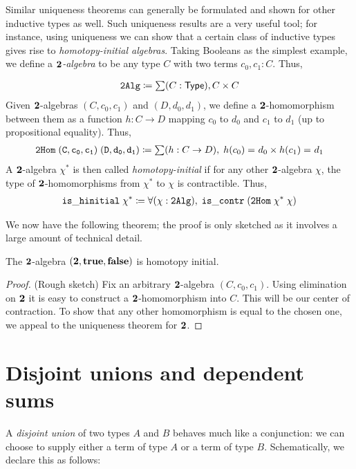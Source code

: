Similar uniqueness theorems can generally be formulated and shown for other inductive types as well. Such uniqueness results are a very useful tool; for instance, using uniqueness we can show that a certain class of inductive types gives rise to \emph{homotopy-initial algebras}. Taking Booleans as the simplest example, we define a \emph{$\mathbf{2}$-algebra} to be any type $C$ with two terms $c_0, c_1 : C$. Thus,

\begin{align*}
\mathtt{2Alg} \defeq \sm {C : \type} C \times C
\end{align*}
Given $\mathbf{2}$-algebras $(C,c_0,c_1)$ and $(D,d_0,d_1)$, we define a $\mathbf{2}$-homomorphism between them as a function $h : C \to D$ mapping $c_0$ to $d_0$ and
$c_1$ to $d_1$ (up to propositional equality). Thus,
\begin{align*}
\mathtt{2Hom \; (C,c_0,c_1) \; (D,d_0,d_1)} \defeq \sm {h : C \to D} \; \id{h(c_0)}{d_0} \times \id{h(c_1)}{d_1}
\end{align*}
A $\mathbf{2}$-algebra $\chi^*$ is then called \emph{homotopy-initial} if for any other $\mathbf{2}$-algebra $\chi$, the type of $\mathbf{2}$-homomorphisms from $\chi^*$ to $\chi$ is contractible. Thus,
\begin{align*}
\mathtt{is\_hinitial \; \chi^* \defeq \fall{\chi : 2Alg} \; is\_contr \; (2Hom \; \chi^*\; \chi)}
\end{align*}

We now have the following theorem; the proof is only sketched as it involves a large amount of technical detail.
\begin{thm}
The $\mathbf{2}$-algebra $(\mathbf{2}, \mathbf{true}, \mathbf{false})$ is homotopy initial.
\end{thm}
\begin{proof}
(Rough sketch) Fix an arbitrary $\mathbf{2}$-algebra $(C,c_0,c_1)$. Using elimination on $\mathbf{2}$ it is easy to construct a $\mathbf{2}$-homomorphism into $C$. This will be our
center of contraction. To show that any other homomorphism is equal to the chosen one, we appeal to the uniqueness theorem for $\mathbf{2}$.
\end{proof}

\section{Disjoint unions and dependent sums}
A \emph{disjoint union} of two types $A$ and $B$ behaves much like a conjunction: we can choose to supply either a term of type $A$ or a term of type $B$. Schematically, we declare this as follows:

